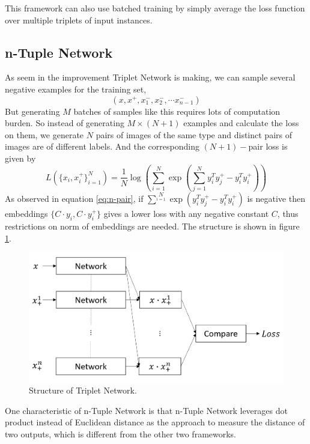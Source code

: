 \documentclass[10pt,twocolumn,letterpaper]{article}
\begin{document}
			This framework can also use batched training by simply average the loss function over multiple triplets of input instances.
			
			\subsection{n-Tuple Network}

				As seem in the improvement Triplet Network is making, we can sample several negative examples for the training set, 
				$$(x,x^+,x^-_1,x^-_2,\cdots x^-_{n-1})$$
				But generating $M$ batches of samples like this requires lots of computation burden. So instead of generating $M\times(N+1)$ examples and calculate the loss on them, we generate $N$ pairs of images of the same type and distinct pairs of images are of different labels. And the corresponding $(N+1)-$pair loss is given by 
				\begin{equation}
				L(\{x_i,x_i^+\}^N_{i=1})=\frac{1}{N}\log(\sum_{i=1}^N\exp(\sum_{j=1}^Ny^T_iy_j^+-y_i^Ty_i^+))  \label{eq:n-pair}
				\end{equation}
				As observed in equation \ref{eq:n-pair}, if $\sum^N\limits_{i=1}\exp(y^T_iy_j^+-y_i^Ty_i^+)$ is negative then embeddings $\{C\cdot y_i,C\cdot y_i^+\}$ gives a lower loss with any negative constant $C$, thus restrictions on norm of embeddings are needed. The structure is shown in figure \ref{fig:tuple_struct}.
				
				\begin{figure}[htbp]
					\begin{center}
						\includegraphics[width=0.9\linewidth]{tuple_struct}
					\end{center}
					\caption{Structure of Triplet Network.\label{fig:tuple_struct}}
				\end{figure}
				
				One characteristic of n-Tuple Network is that n-Tuple Network leverages dot product instead of Euclidean distance as the approach to measure the distance of two outputs, which is different from the other two frameworks.
\end{document}

